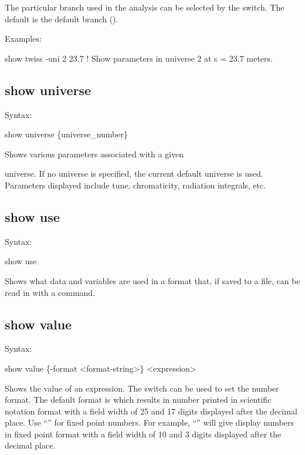 {{{{{{{{{The particular branch used in the analysis can be selected by the  switch. The
default is the default branch ().

Examples:
\begin{example}
  show twiss -uni 2 23.7     ! Show parameters in universe 2 at s = 23.7 meters.
\end{example} 


\subsection{show universe}
\label{s:show.universe}

Syntax:
\begin{example}
  show universe \{universe_number\}
\end{example}

Shows various parameters associated with a given

universe. If no universe is specified, the current default universe is used. Parameters
displayed include tune, chromaticity, radiation integrals, etc.


\subsection{show use}
\label{s:show.use}

Syntax:
\begin{example}
  show use
\end{example}

Shows what data and variables are used in a format that, if saved to a file, can be read
in with a  command.


\subsection{show value}
\label{s:show.value}

Syntax:
\begin{example}
  show value \{-format <format-string>\} <expression>
\end{example}

Shows the value of an expression. The  switch can be used to set the number format.
The default format is  which results in number printed in scientific notation format
with a field width of 25 and 17 digits displayed after the decimal place. Use ``'' for fixed
point numbers. For example, ``'' will give display numbers in fixed point format with a
field width of 10 and 3 digits displayed after the decimal place.

}}}}}}}}}
